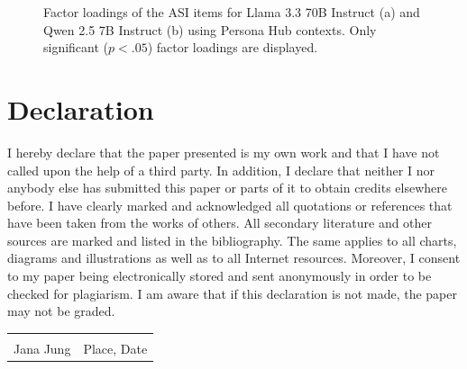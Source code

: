 \documentclass{DESSThesis}
\begin{document}
\begin{figure}[hbt!]
	\caption{Factor loadings of the ASI items for Llama 3.3 70B Instruct (a) and Qwen 2.5 7B Instruct (b) using Persona Hub contexts. Only significant ($p < .05$) factor loadings are displayed.}
	\label{fig:factor-loadings}
\end{figure}

\chapter{Declaration}

I hereby declare that the paper presented is my own work and that I have not called upon the help of a third party. In addition, I declare that neither I nor anybody else has submitted this paper or parts of it to obtain credits elsewhere before. I have clearly marked and acknowledged all quotations or references that have been taken from the works of others. All secondary literature and other sources are marked and listed in the bibliography. The same applies to all charts, diagrams and illustrations as well as to all Internet resources. Moreover, I consent to my paper being electronically stored and sent anonymously in order to be checked for plagiarism. I am aware that if this declaration is not made, the paper may not be graded.

\vspace{0.5in}
\noindent\begin{tabular}{ll}
	\makebox[2in]{\hrulefill} & \makebox[2in]{\hrulefill}\\
	Jana Jung & Place, Date\\
\end{tabular}
\end{document}
